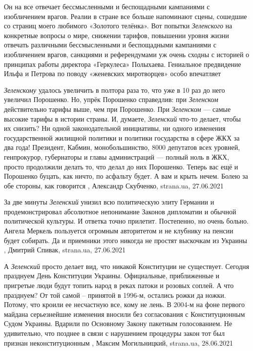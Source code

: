Он на все отвечает бессмысленными и беспощадными кампаниями с изобличением
врагов.  Реалии в стране все больше напоминают сцены, сошедшие со страниц моего
любимого «Золотого телёнка». Вот попытки \emph{Зеленского} на конкретные вопросы о
мире, снижении тарифов, повышении уровня жизни отвечать различными
бессмысленными и беспощадными кампаниями с изобличением врагов, санкциями и
референдумами уж очень сходны с историей о принципах работы директора
«Геркулеса» Полыхаева.  Гениальное предвидение Ильфа и Петрова по поводу
«женевских миротворцев» особо впечатляет


\emph{Зеленскому} удалось увеличить в полтора раза то, что уже в 10 раз до него
увеличил Порошенко. Но, упрёк Порошенко справедлив: при \emph{Зеленском} действительно
тарифы выше, чем при Порошенко. При \emph{Зеленском} — самые высокие тарифы в истории
страны.  И, думаете, \emph{Зеленский} что-то делает, чтобы их снизить? Ни одной
законодательной инициативы, ни одного изменения государственной жилищной
политики и политики государства в сфере ЖКХ за два года! Президент, Кабмин,
монобольшинство, 8000 депутатов всех уровней, генпрокурор, губернаторы и главы
администраций — полный ноль в ЖКХ, просто продолжили делать то, что делал до
них Порошенко. Теперь вас ещё и Порошенко буцать, как ничто, по асфальту будет.
А вам и крыть нечем. Болею за обе стороны, как говорится
, 
Александр Скубченко, strana.ua, 27.06.2021

За две минуты \emph{Зеленский} унизил всю политическую элиту Германии и
продемонстрировал абсолютное непонимание Законов дипломатии и обычной
политической культуры.  И ответка точно прилетит. Постепенно, но очень больно.
Ангела Меркель пользуется огромным авторитетом и не клубнику на пенсии будет
собирать.  Да и приемники этого никогда не простят выскочкам из Украины
, 
Дмитрий Спивак, strana.ua, 27.06.2021

А \emph{Зеленский} просто делает вид, что никакой Конституции не существует.  Сегодня
празднуем День Конституции Украины. Официальные, приближенные и пригретые люди
будут топить народ в реках патоки и розовых соплей. А что празднуем? От той
самой – принятой в 1996-м, остались рожки да ножки. Потому, что кроили ее
несчастную все, кому не лень.  В 2004-м на фоне первого майдана серьезнейшие
изменения вносили без согласования с Конституционным Судом Украины. Вдарили по
Основному Закону пакетным голосованием. Не удивительно, что позднее в связи с
нарушением процедуры закон тот был признан неконституционным
  , 
	Максим Могильницкий, strana.ua, 28.06.2021
